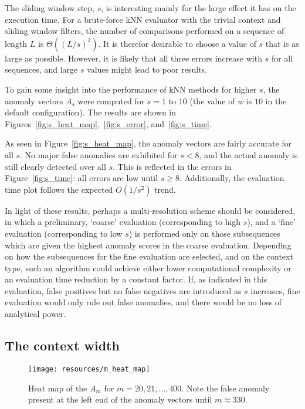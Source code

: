 The sliding window step, $s$, is interesting mainly for the large effect it has on the execution time. For a brute-force kNN evaluator with the trivial context and sliding window filters, the number of comparisons performed on a sequence of length $L$ is $\Theta({(L/s)}^2)$. It is therefor desirable to choose a value of $s$ that is as large as possible. However, it is likely that all three errors increase with $s$ for all sequences, and large $s$ values might lead to poor results.

To gain some insight into the performance of kNN methods for higher $s$, the anomaly vectors $A_s$ were computed for $s = 1$ to $10$ (the value of $w$ is $10$ in the default configuration). The results are shown in Figures~\ref{fig:s_heat_map},~\ref{fig:s_error}, and~\ref{fig:s_time}.

As seen in Figure~\ref{fig:s_heat_map}, the anomaly vectors are fairly accurate for all $s$. No major false anomalies are exhibited for $s < 8$, and the actual anomaly is still clearly detected over all $s$. This is reflected in the errors in Figure~\ref{fig:s_time}: all errors are low until $s \geq 8$. Additionally, the evaluation time plot follows the expected $O(1/s^2)$ trend.

In light of these results, perhaps a multi-resolution scheme should be considered, in which a preliminary, `coarse' evaluation (corresponding to high $s$), and a `fine' evaluation (corresponding to low $s$) is performed only on those subsequences which are given the highest anomaly scores in the coarse evaluation. Depending on how the subsequences for the fine evaluation are selected, and on the context type, such an algorithm could achieve either lower computational complexity or an evaluation time reduction by a constant factor. If, as indicated in this evaluation, false positives but no false negatives are introduced as $s$ increases, fine evaluation would only rule out false anomalies, and there would be no loss of analytical power.

\subsection{The context width}
\FloatBarrier{}
\label{sect:m}

\begin{figure}[H]
    \vspace{-15pt}
    \begin{center}
        \texttt{[image: resources/m\_heat\_map]}
    \end{center}
    \vspace{-20pt}
    \caption{\small{Heat map of the $A_m$ for $m = 20, 21, \dots, 400$. Note the false anomaly present at the left end of the anomaly vectors until $m \approx 330$.}}
    \vspace{-10pt}
\label{fig:m_heat_map}
\end{figure}


